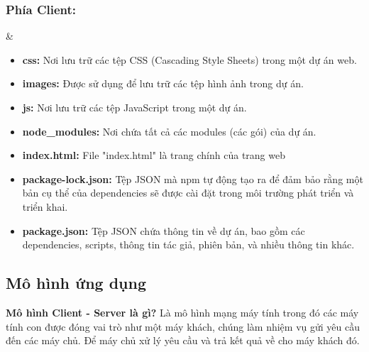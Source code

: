 \documentclass[a4paper]{article}
\begin{document}
\subsubsection{Phía Client:}
    \begin{picture}
   \end{picture}&
\begin{itemize}
    \item    \textbf{css:}
    Nơi lưu trữ các tệp CSS (Cascading Style Sheets) trong một dự án web.
        \item    \textbf{images:}
   Được sử dụng để lưu trữ các tệp hình ảnh trong dự án.
   \item    \textbf{js:}
   Nơi lưu trữ các tệp JavaScript trong một dự án.
   \item    \textbf{node\_modules:}
   Nơi chứa tất cả các modules (các gói) của dự án. 
   \item \textbf{index.html:}
   File "index.html" là trang chính của trang web
   \item \textbf{package-lock.json:}
  Tệp JSON mà npm tự động tạo ra để đảm bảo rằng một bản cụ thể của dependencies sẽ được cài đặt trong môi trường phát triển và triển khai.
   \item \textbf{package.json:}
   Tệp JSON chứa thông tin về dự án, bao gồm các dependencies, scripts, thông tin tác giả, phiên bản, và nhiều thông tin khác.
\end{itemize}

\subsection{Mô hình ứng dụng }
\textbf{Mô hình Client - Server là gì?}
Là mô hình mạng máy tính trong đó các máy tính con được đóng vai trò như một máy khách, chúng làm nhiệm vụ gửi yêu cầu đến các máy chủ. Để máy chủ xử lý yêu cầu và trả kết quả về cho máy khách đó.
\end{document}
